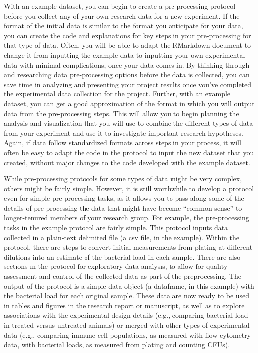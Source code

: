 \documentclass[]{tufte-book}
\begin{document}
With an example dataset, you can begin to create a pre-processing protocol
before you collect any of your own research data for a new experiment. If the
format of the initial data is similar to the format you anticipate for your
data, you can create the code and explanations for key steps in your
pre-processing for that type of data. Often, you will be able to adapt the
RMarkdown document to change it from inputting the example data to inputting
your own experimental data with minimal complications, once your data comes in.
By thinking through and researching data pre-processing options before the data
is collected, you can save time in analyzing and presenting your project results
once you've completed the experimental data collection for the project. Further,
with an example dataset, you can get a good approximation of the format in which
you will output data from the pre-processing steps. This will allow you to begin
planning the analysis and visualization that you will use to combine the
different types of data from your experiment and use it to investigate important
research hypotheses. Again, if data follow standardized formats across steps in
your process, it will often be easy to adapt the code in the protocol to input
the new dataset that you created, without major changes to the code developed
with the example dataset.

While pre-processing protocols for some types of data might be very complex,
others might be fairly simple. However, it is still worthwhile to develop a
protocol even for simple pre-processing tasks, as it allows you to pass along
some of the details of pre-processing the data that might have become ``common
sense'' to longer-tenured members of your research group. For example, the
pre-processing tasks in the example protocol are fairly simple. This protocol
inputs data collected in a plain-text delimited file (a csv file, in the
example). Within the protocol, there are steps to convert initial measurements
from plating at different dilutions into an estimate of the bacterial load in
each sample. There are also sections in the protocol for exploratory data
analysis, to allow for quality assessment and control of the collected data as
part of the preprocessing. The output of the protocol is a simple data object (a
dataframe, in this example) with the bacterial load for each original sample.
These data are now ready to be used in tables and figures in the research report
or manuscript, as well as to explore associations with the experimental design
details (e.g., comparing bacterial load in treated versus untreated animals) or
merged with other types of experimental data (e.g., comparing immune cell
populations, as measured with flow cytometry data, with bacterial loads, as
measured from plating and counting CFUs).
\end{document}
